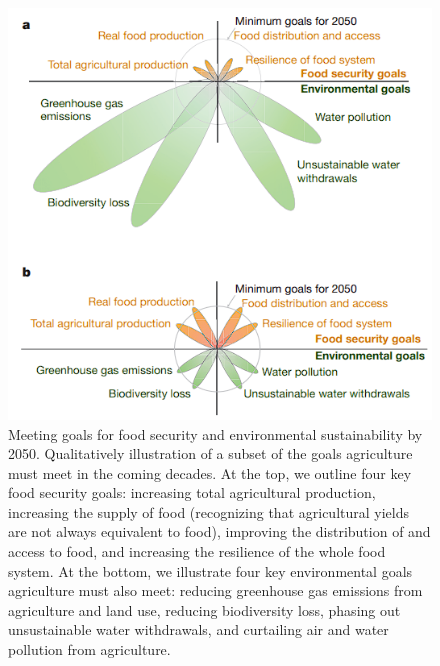 \begin{figure}[H]
    \centering
    \includegraphics[width=0.8\linewidth]{Images/security.png}
    \caption{Meeting goals for food security and environmental sustainability by 2050. Qualitatively illustration of a subset of the goals agriculture must meet in the coming decades. At the top, we outline four key food security goals: increasing total agricultural production, increasing the supply of food (recognizing that agricultural yields are not always equivalent to food), improving the distribution of and access to food, and increasing the resilience of the whole food system. At the bottom, we illustrate four key environmental goals agriculture must also meet: reducing greenhouse gas emissions from agriculture and land use, reducing biodiversity loss, phasing out unsustainable water withdrawals, and curtailing air and water pollution from agriculture. \cite{Cardinale2012}}
    \label{fig:security}
\end{figure}

